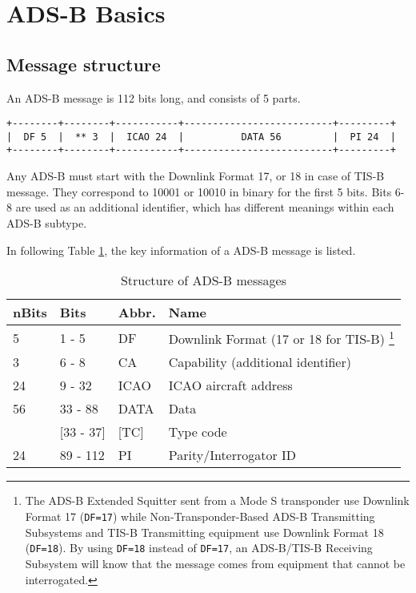 \section{ADS-B Basics}\label{introduction}

\subsection{Message structure}\label{message-structure}

An ADS-B message is 112 bits long, and consists of 5 parts.

\begin{verbatim}
+--------+--------+-----------+--------------------------+---------+
|  DF 5  |  ** 3  |  ICAO 24  |          DATA 56         |  PI 24  |
+--------+--------+-----------+--------------------------+---------+
\end{verbatim}

Any ADS-B must start with the Downlink Format 17, or 18 in case of TIS-B message. They correspond to 10001 or 10010 in binary for the first 5 bits. Bits 6-8 are used as an additional identifier, which has different meanings within each ADS-B subtype.

In following Table \ref{tb:adsb-structure}, the key information of a ADS-B message is listed.

\begin{table}[!ht]
\centering
\caption{Structure of ADS-B messages}
\label{tb:adsb-structure}
\begin{tabular}{@{}llll@{}}
\toprule
nBits & Bits & Abbr. & Name \\ \midrule
5 & 1 - 5 & DF & Downlink Format (17 or 18 for TIS-B) \footnote{The ADS-B Extended Squitter sent from a Mode S transponder use Downlink Format 17 (\texttt{DF=17}) while Non-Transponder-Based ADS-B Transmitting Subsystems and TIS-B Transmitting equipment use Downlink Format 18 (\texttt{DF=18}). By using \texttt{DF=18} instead of \texttt{DF=17}, an ADS-B/TIS-B Receiving Subsystem will know that the message comes from equipment that cannot be interrogated.} \\
3 & 6 - 8 & CA & Capability (additional identifier) \\
24 & 9 - 32 & ICAO & ICAO aircraft address \\
56 & 33 - 88 & DATA & Data \\
 & {[}33 - 37{]} & {[}TC{]} & Type code \\
24 & 89 - 112 & PI & Parity/Interrogator ID \\ \bottomrule
\end{tabular}
\end{table}


